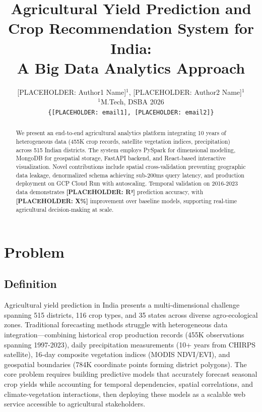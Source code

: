 \documentclass[10pt,a4paper]{article}
\title{\textbf{Agricultural Yield Prediction and Crop Recommendation System for India: \\ A Big Data Analytics Approach}}
\author{
  [PLACEHOLDER: Author1 Name]$^{1}$, [PLACEHOLDER: Author2 Name]$^{1}$ \\
  $^{1}$M.Tech, DSBA 2026 \\
  \texttt{\{[PLACEHOLDER: email1], [PLACEHOLDER: email2]\}}
}
\date{}
\begin{document}
\maketitle

\begin{abstract}
We present an end-to-end agricultural analytics platform integrating 10 years of heterogeneous data (455K crop records, satellite vegetation indices, precipitation) across 515 Indian districts. The system employs PySpark for dimensional modeling, MongoDB for geospatial storage, FastAPI backend, and React-based interactive visualization. Novel contributions include spatial cross-validation preventing geographic data leakage, denormalized schema achieving sub-200ms query latency, and production deployment on GCP Cloud Run with autoscaling. Temporal validation on 2016-2023 data demonstrates \textbf{[PLACEHOLDER: R²]} prediction accuracy, with \textbf{[PLACEHOLDER: X\%]} improvement over baseline models, supporting real-time agricultural decision-making at scale.
\end{abstract}

\section{Problem}

\subsection{Definition}
Agricultural yield prediction in India presents a multi-dimensional challenge spanning 515 districts, 116 crop types, and 35 states across diverse agro-ecological zones. Traditional forecasting methods struggle with heterogeneous data integration—combining historical crop production records (455K observations spanning 1997-2023), daily precipitation measurements (10+ years from CHIRPS satellite), 16-day composite vegetation indices (MODIS NDVI/EVI), and geospatial boundaries (784K coordinate points forming district polygons). The core problem requires building predictive models that accurately forecast seasonal crop yields while accounting for temporal dependencies, spatial correlations, and climate-vegetation interactions, then deploying these models as a scalable web service accessible to agricultural stakeholders.
\end{document}
